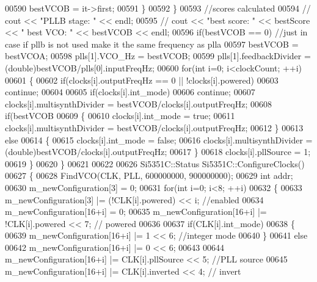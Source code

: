 \begin{DoxyCode}
{00590             bestVCOB = it->first;
00591         \}
00592     \}
00593     \textcolor{comment}{//scores calculated}
00594 \textcolor{comment}{//    cout << "PLLB stage: " << endl;}
00595 \textcolor{comment}{//    cout << "best score: " << bestScore << "     best VCO: " << bestVCOB << endl;}
00596     \textcolor{keywordflow}{if}(bestVCOB == 0) \textcolor{comment}{//just in case if pllb is not used make it the same frequency as plla}
00597         bestVCOB = bestVCOA;
00598     plls[1].VCO_Hz = bestVCOB;
00599     plls[1].feedbackDivider = (double)bestVCOB/plls[0].inputFreqHz;
00600     \textcolor{keywordflow}{for}(\textcolor{keywordtype}{int} i=0; i<clockCount; ++i)
00601     \{
00602         \textcolor{keywordflow}{if}(clocks[i].outputFreqHz == 0 || !clocks[i].powered)
00603                 \textcolor{keywordflow}{continue};
00604 
00605         \textcolor{keywordflow}{if}(clocks[i].int\_mode)
00606             \textcolor{keywordflow}{continue};
00607         clocks[i].multisynthDivider = bestVCOB/clocks[i].outputFreqHz;
00608         \textcolor{keywordflow}{if}(bestVCOB%
00609         \{
00610             clocks[i].int_mode = \textcolor{keyword}{true};
00611             clocks[i].multisynthDivider = bestVCOB/clocks[i].outputFreqHz;
00612         \}
00613         \textcolor{keywordflow}{else}
00614         \{
00615             clocks[i].int_mode = \textcolor{keyword}{false};
00616             clocks[i].multisynthDivider = (double)bestVCOB/clocks[i].outputFreqHz;
00617         \}
00618         clocks[i].pllSource = 1;
00619     \}
00620 \}
00621 
00622 
00626 Si5351C::Status Si5351C::ConfigureClocks()
00627 \{
00628     FindVCO(CLK, PLL, 600000000, 900000000);
00629     \textcolor{keywordtype}{int} addr;
00630     m\_newConfiguration[3] = 0;
00631     \textcolor{keywordflow}{for}(\textcolor{keywordtype}{int} i=0; i<8; ++i)
00632     \{
00633         m\_newConfiguration[3] |= (!CLK[i].powered) << i; \textcolor{comment}{//enabled}
00634         m\_newConfiguration[16+i] = 0;
00635         m\_newConfiguration[16+i] |= !CLK[i].powered << 7; \textcolor{comment}{// powered}
00636 
00637         \textcolor{keywordflow}{if}(CLK[i].int\_mode)
00638         \{
00639             m\_newConfiguration[16+i] |= 1 << 6; \textcolor{comment}{//integer mode}
00640         \}
00641         \textcolor{keywordflow}{else}
00642             m\_newConfiguration[16+i] |= 0 << 6;
00643 
00644         m\_newConfiguration[16+i] |= CLK[i].pllSource << 5; \textcolor{comment}{//PLL source}
00645         m\_newConfiguration[16+i] |= CLK[i].inverted << 4; \textcolor{comment}{// invert}
}
\end{DoxyCode}
